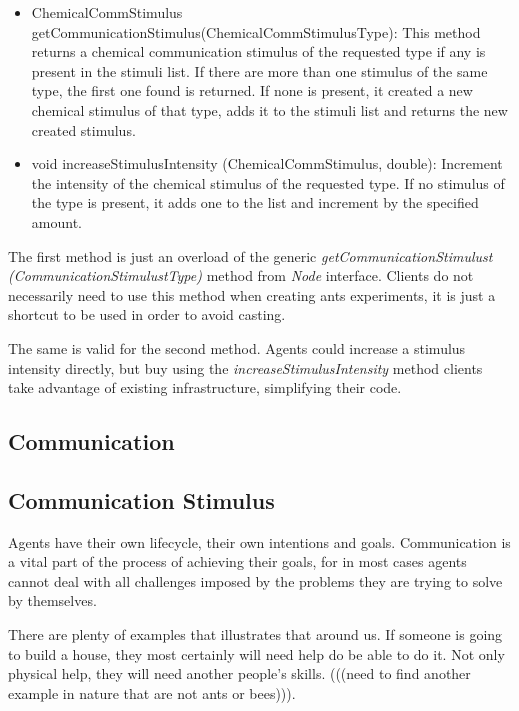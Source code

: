 \begin{itemize}
  \item ChemicalCommStimulus getCommunicationStimulus(ChemicalCommStimulusType): This method returns a chemical communication stimulus of the requested type if any is present in the stimuli list. If there are more than one stimulus of the same type, the first one found is returned. If none is present, it created a new chemical stimulus of that type, adds it to the stimuli list and returns the new created stimulus.

  \item void increaseStimulusIntensity (ChemicalCommStimulus, double): Increment the intensity of the chemical stimulus of the requested type. If no stimulus of the type is present, it adds one to the list and increment by the specified amount.
\end{itemize}

The first method is just an overload of the generic \emph{getCommunicationStimulust (CommunicationStimulustType)} method from \emph{Node} interface. Clients do not necessarily need to use this method when creating ants experiments, it is just a shortcut to be used in order to avoid casting.

The same is valid for the second method. Agents could increase a stimulus intensity directly, but buy using the \emph{increaseStimulusIntensity} method clients take advantage of existing infrastructure, simplifying their code.

\subsection {Communication}
\label{subsec:comm-stimulus}

\subsection{Communication Stimulus}

Agents have their own lifecycle, their own intentions and goals. Communication is a vital part of the process of achieving their goals, for in most cases agents cannot deal with all challenges imposed by the problems they are trying to solve by themselves.

There are plenty of examples that illustrates that around us. If someone is going to build a house, they most certainly will need help do be able to do it. Not only physical help, they will need another people's skills. (((need to find another example in nature that are not ants or bees))).

